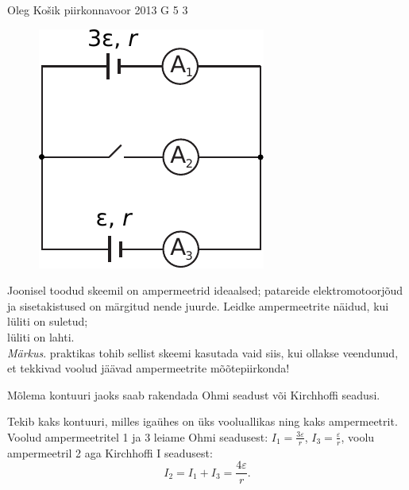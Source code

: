 {Oleg Košik} %
{piirkonnavoor} %
{2013} %
{G 5} %
{3} %
{
\ifStatement
\begin{figure}%
\vspace{-12pt}
\includegraphics[width=\linewidth]{2013-v2g-05-skeem}%
\end{figure}
Joonisel toodud skeemil on ampermeetrid ideaalsed; patareide elektromotoorjõud
ja sisetakistused on märgitud nende juurde. Leidke ampermeetrite näidud, kui\\
\osa lüliti on suletud;\\
\osa lüliti on lahti.\\
\emph{Märkus}. praktikas tohib
sellist skeemi kasutada vaid siis, kui ollakse veendunud, et tekkivad voolud
jäävad ampermeetrite mõõtepiirkonda!
\fi


\ifHint
Mõlema kontuuri jaoks saab rakendada Ohmi seadust või Kirchhoffi seadusi.
\fi


\ifSolution
\osa Tekib kaks kontuuri, milles igaühes on üks vooluallikas ning kaks ampermeetrit. Voolud ampermeetritel 1 ja 3 leiame Ohmi seadusest: $I_1=\frac{3\varepsilon}{r}$, $I_3=\frac{\varepsilon}{r}$, voolu ampermeetril 2 aga Kirchhoffi I seadusest: 
\[
I_2=I_1+I_3=\frac{4\varepsilon}{r}.
\]

}
